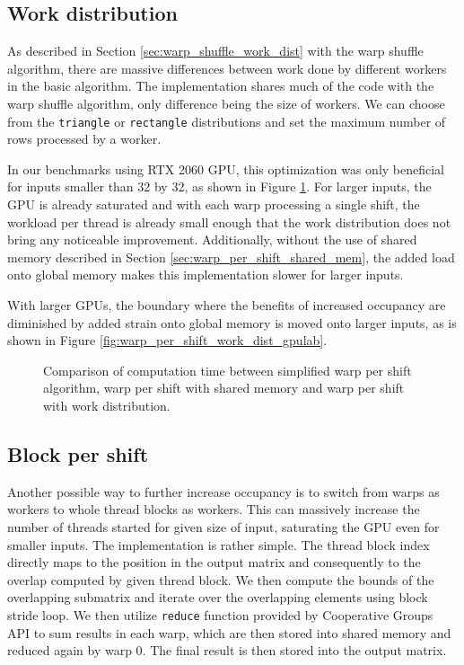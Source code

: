 \subsection{Work distribution}

As described in Section \ref{sec:warp_shuffle_work_dist} with the warp shuffle algorithm, there are massive differences between work done by different workers in the basic algorithm. The implementation shares much of the code with the warp shuffle algorithm, only difference being the size of workers. We can choose from the \texttt{triangle} or \texttt{rectangle} distributions and set the maximum number of rows processed by a worker.

In our benchmarks using RTX 2060 GPU, this optimization was only beneficial for inputs smaller than 32 by 32, as shown in Figure \ref{fig:warp_per_shift_work_dist_local_results}. For larger inputs, the GPU is already saturated and with each warp processing a single shift, the workload per thread is already small enough that the work distribution does not bring any noticeable improvement. Additionally, without the use of shared memory described in Section \ref{sec:warp_per_shift_shared_mem}, the added load onto global memory makes this implementation slower for larger inputs.

With larger GPUs, the boundary where the benefits of increased occupancy are diminished by added strain onto global memory is moved onto larger inputs, as is shown in Figure \ref{fig:warp_per_shift_work_dist_gpulab}. %


\begin{figure}[ht]
	\centering
	\def\svgwidth{0.4\textwidth}
	
	\caption{Comparison of computation time between simplified warp per shift algorithm, warp per shift with shared memory and warp per shift with work distribution.}
	\label{fig:warp_per_shift_work_dist_local_results}
\end{figure}



\subsection{Block per shift}

Another possible way to further increase occupancy is to switch from warps as workers to whole thread blocks as workers. This can massively increase the number of threads started for given size of input, saturating the GPU even for smaller inputs.
The implementation is rather simple. The thread block index directly maps to the position in the output matrix and consequently to the overlap computed by given thread block. We then compute the bounds of the overlapping submatrix and iterate over the overlapping elements using block stride loop. We then utilize \texttt{reduce} function provided by Cooperative Groups API to sum results in each warp, which are then stored into shared memory and reduced again by warp 0. The final result is then stored into the output matrix.

